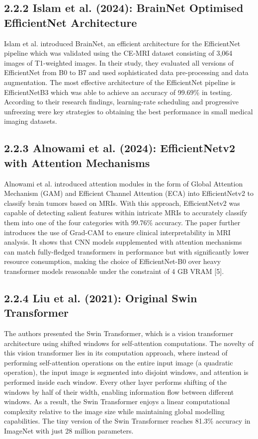\documentclass[12pt,a4paper,oneside]{report}
\begin{document}
\subsection*{2.2.2 Islam et al. (2024): BrainNet Optimised EfficientNet Architecture}
Islam et al. introduced BrainNet, an efficient architecture for the EfficientNet pipeline which was validated using the CE-MRI dataset consisting of 3,064 images of T1-weighted images. In their study, they evaluated all versions of EfficientNet from B0 to B7 and used sophisticated data pre-processing and data augmentation. The most effective architecture of the EfficientNet pipeline is EfficientNetB3 which was able to achieve an accuracy of 99.69\% in testing. According to their research findings, learning-rate scheduling and progressive unfreezing were key strategies to obtaining the best performance in small medical imaging datasets.
\subsection*{2.2.3 Alnowami et al. (2024): EfficientNetv2 with Attention Mechanisms}
Alnowami et al. introduced attention modules in the form of Global Attention Mechanism (GAM) and Efficient Channel Attention (ECA) into EfficientNetv2 to classify brain tumors based on MRIs. With this approach, EfficientNetv2 was capable of detecting salient features within intricate MRIs to accurately classify them into one of the four categories with 99.76\% accuracy. The paper further introduces the use of Grad-CAM to ensure clinical interpretability in MRI analysis. It shows that CNN models supplemented with attention mechanisms can match fully-fledged transformers in performance but with significantly lower resource consumption, making the choice of EfficientNet-B0 over heavy transformer models reasonable under the constraint of 4 GB VRAM [5].
\subsection*{2.2.4 Liu et al. (2021): Original Swin Transformer}
The authors presented the Swin Transformer, which is a vision transformer architecture using shifted windows for self-attention computations. The novelty of this vision transformer lies in its computation approach, where instead of performing self-attention operations on the entire input image (a quadratic operation), the input image is segmented into disjoint windows, and attention is performed inside each window. Every other layer performs shifting of the windows by half of their width, enabling information flow between different windows. As a result, the Swin Transformer enjoys a linear computational complexity relative to the image size while maintaining global modelling capabilities. The tiny version of the Swin Transformer reaches 81.3\% accuracy in ImageNet with just 28 million parameters.
\end{document}
